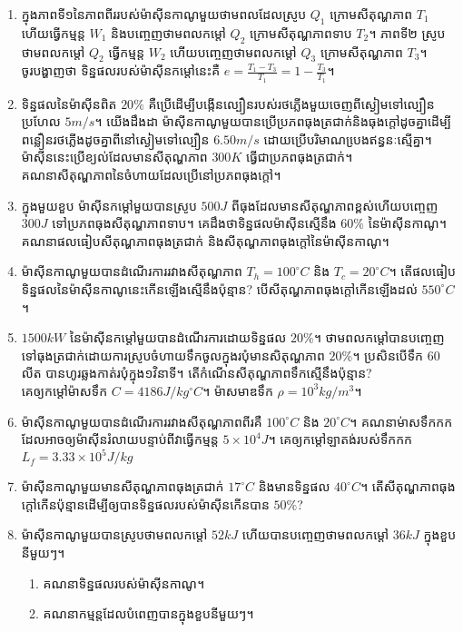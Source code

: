 \begin{enumerate}
\begin{enumerate}
	\end{enumerate}
	\item ក្នុងភាពទី១នៃភាពពីររបស់ម៉ាសុីនកាណូមួយថាមពលដែលស្រូប $Q_{1}$ ក្រោមសីតុណ្ហភាព $T_{1}$ ហើយធ្វើកម្មន្ត $W_{1}$ និងបញ្ចេញថាមពលកម្តៅ $Q_{2}$ ក្រោមសីតុណ្ហភាពទាប $T_{2}$។ ភាពទី២ ស្រូបថាមពលកម្តៅ $Q_{2}$ ធ្វើកម្មន្ត $W_{2}$ ហើយបញ្ចេញថាមពលកម្តៅ $Q_{3}$ ក្រោមសីតុណ្ហភាព $T_{3}$។\\
	ចូរបង្ហាញថា ទិន្នផលរបស់ម៉ាសុីនកម្តៅនេះគឺ $e=\frac{T_{1}-T_{3}}{T_{1}}=1-\frac{T_{3}}{T_{1}}$។ 
	\item ទិន្នផលនៃម៉ាសុីនពិត $20\%$ គឺប្រើដើម្បីបង្កើនល្បឿនរបស់រថភ្លើងមួយចេញពីស្ងៀមទៅល្បឿនប្រហែល $5m/s$។ យើងដឹងដា ម៉ាសុីនកាណូមួយបានប្រើប្រភពធុងត្រជាក់និងធុងក្តៅដូចគ្នាដើម្បីពន្លឿនរថភ្លើងដូចគ្នាពីនៅស្ងៀមទៅល្បឿន $6.50m/s$ ដោយប្រើបរិមាណបេ្រងឥន្ធនៈស្មើគ្នា។ ម៉ាសុីននេះប្រើខ្យល់ដែលមានសីតុណ្ហភាព $300K$ ធ្វើជាប្រភពធុងត្រជាក់។\\
	គណនាសីតុណ្ហភាពនៃចំហាយដែលប្រើនៅប្រភពធុងក្តៅ។
	\item ក្នុងមួយខួប ម៉ាសុីនកម្តៅមួយបានស្រូប $500J$ ពីធុងដែលមានសីតុណ្ហភាពខ្ពស់ហើយបញ្ចេញ $300J$ ទៅប្រភពធុងសីតុណ្ហភាពទាប។ គេដឹងថាទិន្នផលម៉ាសុីនស្មើនឹង $60\%$ នៃម៉ាសុីនកាណូ។ គណនាផលធៀបសីតុណ្ហភាពធុងត្រជាក់ និងសីតុណ្ហភាពធុងក្តៅនៃម៉ាសុីនកាណូ។
	\item ម៉ាសុីនកាណូមួយបានដំណើរការរវាងសីតុណ្ហភាព $T_{h}=100^\circ C$ និង $T_{c}=20^\circ C$។ តើផលធៀបទិន្នផលនៃម៉ាសុីនកាណូនេះកើនឡើងស្មើនឹងប៉ុន្មាន? បើសីតុណ្ហភាពធុងក្តៅកើនឡើងដល់ $550^\circ C$។
	\item $1500kW$ នៃម៉ាសុីនកម្តៅមួយបានដំណើរការដោយទិន្នផល $20\%$។ ថាមពលកម្តៅបានបញ្ចេញទៅធុងត្រជាក់ដោយការស្រូបចំហាយទឹកចូលក្នុងរបុំមានសិតុណ្ហភាព $20\%$។ ប្រសិនបើទឹក $60$លីត បានហូរឆ្លងកាត់របុំក្នុង១វិនាទី។ តើកំណើនសីតុណ្ហភាពទឹកស្មើនឹងប៉ុន្មាន? \\គេឲ្យកម្តៅម៉ាសទឹក $C=4186J/kg^\circ C$។ ម៉ាសមាឌទឹក $\rho=10^{3}kg/m^{3}$។
	\item ម៉ាសុីនកាណូមួយបានដំណើរការរវាងសីតុណ្ហភាពពីរគឺ $100^\circ C$ និង $20^\circ C$។
	គណនាម់ាសទឹកកកដែលអាចឲ្យម៉ាសុីនរំលាយបន្ទាប់ពីវាធ្វើកម្មន្ត $5\times10^{4}J$។ គេឲ្យកម្តៅឡាតង់របស់ទឹកកក $L_{f}=3.33\times10^{5}J/kg$
	\item ម៉ាសុីនកាណូមួយមានសីតុណ្ហភាពធុងត្រជាក់ $17^\circ C$ និងមានទិន្នផល $40^\circ C$។ តើសីតុណ្ហភាពធុងក្តៅកើនប៉ុន្មានដើម្បីឲ្យបានទិន្នផលរបស់ម៉ាសុីនកើនបាន $50\%$?
	\item ម៉ាសុីនកាណូមួយបានស្រូបថាមពលកម្តៅ $52kJ$ ហើយបានបញ្ចេញថាមពលកម្តៅ $36kJ$ ក្នុងខួបនីមួយៗ។
	\begin{enumerate}
		\item គណនាទិន្នផលរបស់ម៉ាសុីនកាណូ។
		\item គណនាកម្មន្តដែលបំពេញបានក្នុងខួបនីមួយៗ។
	\end{enumerate}
\end{enumerate}